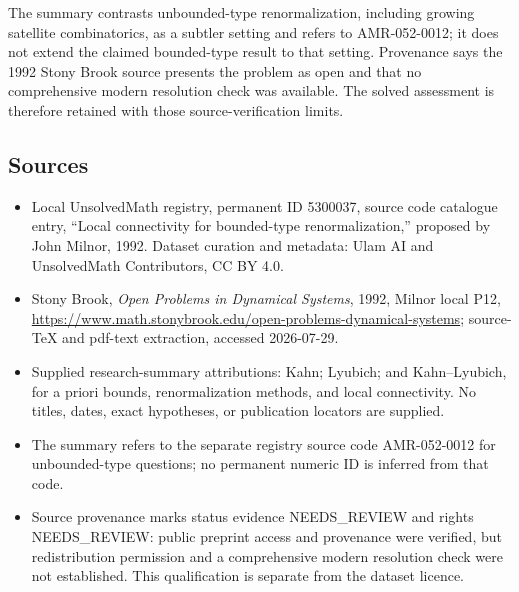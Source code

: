 \documentclass[11pt]{article}
\begin{document}
The summary contrasts unbounded-type renormalization, including growing satellite combinatorics, as a subtler setting and refers to AMR-052-0012; it does not extend the claimed bounded-type result to that setting. Provenance says the 1992 Stony Brook source presents the problem as open and that no comprehensive modern resolution check was available. The solved assessment is therefore retained with those source-verification limits.
\subsection{Sources}
\begin{itemize}
\item Local UnsolvedMath registry, permanent ID 5300037, source code catalogue entry, ``Local connectivity for bounded-type renormalization,'' proposed by John Milnor, 1992. Dataset curation and metadata: Ulam AI and UnsolvedMath Contributors, CC BY 4.0.
\item Stony Brook, \emph{Open Problems in Dynamical Systems}, 1992, Milnor local P12, \url{https://www.math.stonybrook.edu/open-problems-dynamical-systems}; source-TeX and pdf-text extraction, accessed 2026-07-29.
\item Supplied research-summary attributions: Kahn; Lyubich; and Kahn--Lyubich, for a priori bounds, renormalization methods, and local connectivity. No titles, dates, exact hypotheses, or publication locators are supplied.
\item The summary refers to the separate registry source code AMR-052-0012 for unbounded-type questions; no permanent numeric ID is inferred from that code.
\item Source provenance marks status evidence NEEDS\_REVIEW and rights NEEDS\_REVIEW: public preprint access and provenance were verified, but redistribution permission and a comprehensive modern resolution check were not established. This qualification is separate from the dataset licence.
\end{itemize}
\end{document}
